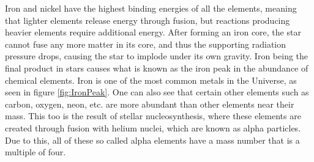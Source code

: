 \documentclass[english, oneside]{HYgradu}
\begin{document}
Iron and nickel have the highest binding energies of all the elements, meaning that lighter elements release energy through fusion, but reactions producing heavier elements require additional energy. After forming an iron core, the star cannot fuse any more matter in its core, and thus the supporting radiation pressure drops, causing the star to implode under its own gravity. Iron being the final product in stars causes what is known as the iron peak in the abundance of chemical elements. Iron is one of the most common metals in the Universe, as seen in figure \ref{fig:IronPeak}. One can also see that certain other elements such as carbon, oxygen, neon, etc. are more abundant than other elements near their mass. This too is the result of stellar nucleosynthesis, where these elements are created through fusion with helium nuclei, which are known as alpha particles. Due to this, all of these so called alpha elements have a mass number that is a multiple of four.
\end{document}
